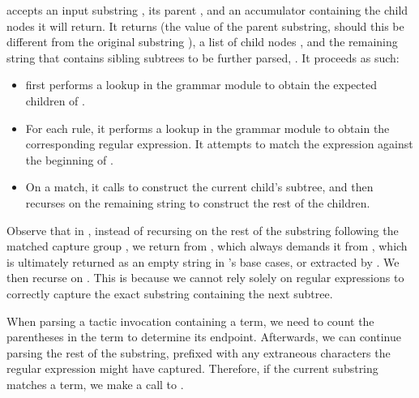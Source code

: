  accepts an input substring , its parent  , and an accumulator  containing the child nodes it will return. It returns  (the value of the parent substring, should this be different from the original substring ), a list of child nodes , and the remaining string that contains sibling subtrees to be further parsed, . It proceeds as such:
\begin{itemize}
    \item {} first performs a lookup in the grammar module to obtain the expected children of .
    \item For each rule, it performs a lookup in the grammar module to obtain the corresponding regular expression. It attempts to match the expression against the beginning of .
    \item On a match, it calls  to construct the current child's subtree, and then recurses on the remaining string to construct the rest of the children.
\end{itemize}

Observe that in , instead of recursing on the rest of the substring following the matched capture group , we return  from , which always demands it from , which is ultimately returned as an empty string in 's base cases, or extracted by . We then recurse on . This is because we cannot rely solely on regular expressions to correctly capture the exact substring containing the next subtree.

When parsing a tactic invocation containing a term, we need to count the parentheses in the term to determine its endpoint. Afterwards, we can continue parsing the rest of the substring, prefixed with any extraneous characters the regular expression might have captured. Therefore, if the current substring matches a term, we make a call to .

